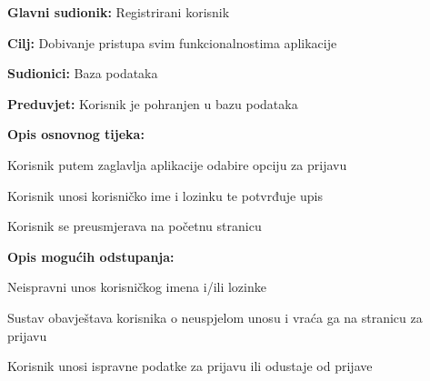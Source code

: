					\noindent {}
					\begin{packed_item}
					
						\item \textbf{Glavni sudionik: } Registrirani korisnik 
						\item  \textbf{Cilj:} Dobivanje pristupa svim funkcionalnostima aplikacije
						\item  \textbf{Sudionici:} Baza podataka 
						\item  \textbf{Preduvjet:} Korisnik je pohranjen u bazu podataka
						\item  \textbf{Opis osnovnog tijeka:}
					
						\item[] \begin{packed_enum}
						
							\item Korisnik putem zaglavlja aplikacije odabire opciju za prijavu 
							\item Korisnik unosi korisničko ime i lozinku te potvrđuje upis
							\item Korisnik se preusmjerava na početnu stranicu
						
						\end{packed_enum}
					
						\item  \textbf{Opis mogućih odstupanja:}
					
						\item[] \begin{packed_item}
						
							\item[2.a] Neispravni unos korisničkog imena i/ili lozinke  
							\item[] \begin{packed_enum}
							
								\item Sustav obavještava korisnika o neuspjelom unosu i vraća ga na stranicu za prijavu  
								\item Korisnik unosi ispravne podatke za prijavu ili odustaje od prijave
							
							\end{packed_enum}
						\end{packed_item}
					\end{packed_item}
				
